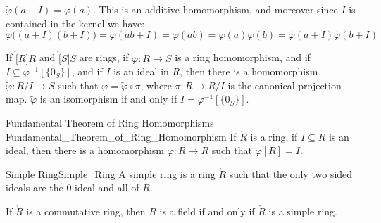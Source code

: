 \documentclass{article}                                                        %
\begin{document}
                $\tilde{\varphi}(a+I)=\varphi(a)$. This is an additive
                homomorphism, and moreover since $I$ is contained in the kernel
                we have:
                \begin{equation}
                    \tilde{\varphi}\big((a+I)(b+I)\big)=\tilde{\varphi}(ab+I)
                    =\varphi(ab)=\varphi(a)\varphi(b)
                    =\tilde{\varphi}(a+I)\tilde{\varphi}(b+I)
                \end{equation}
                \begin{theorem}
                    If $\ring[R]{R}$ and $\ring[S]{S}$ are rings, if
                    $\varphi:R\rightarrow{S}$ is a ring homomorphism, and if
                    $I\subseteq\varphi^{\minus{1}}[\{0_{S}\}]$, and if $I$ is an
                    ideal in $R$, then there is a homomorphism
                    $\tilde{\varphi}:R/I\rightarrow{S}$ such that
                    $\varphi=\tilde{\varphi}\circ\pi$, where
                    $\pi:R\rightarrow{R}/I$ is the canonical projection map.
                    $\tilde{\varphi}$ is an isomorphism if and only if
                    $I=\varphi^{\minus{1}}[\{0_{S}\}]$.
                \end{theorem}
                \begin{ftheorem}{Fundamental Theorem of Ring Homomorphisms}
                                {Fundamental_Theorem_of_Ring_Homomorphism}
                    If $\ring{R}$ is a ring, if $I\subseteq{R}$ is an ideal,
                    then there is a homomorphism $\varphi:R\rightarrow{R}$ such
                    that $\varphi[R]=I$.
                \end{ftheorem}
                \begin{fdefinition}{Simple Ring}{Simple_Ring}
                    A simple ring is a ring $\ring{R}$ such that the only two
                    sided ideals are the 0 ideal and all of $R$.
                \end{fdefinition}
                \begin{theorem}
                    If $\ring{R}$ is a commutative ring, then $R$ is a field if
                    and only if $\ring{R}$ is a simple ring.
                \end{theorem}
\end{document}
